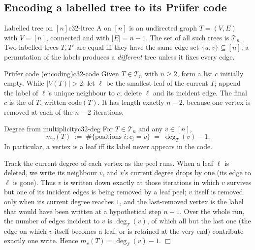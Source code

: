 \subsection{Encoding a labelled tree to its Pr\"ufer code}

\begin{definition}{Labelled tree on \([n]\)}{c32-ltree}
A  on \([n]\) is an undirected graph \(T=(V,E)\) with
\(V=[n]\), connected and with \(|E|=n-1\).  The set of all such trees is
\(\mathcal{T}_n\).  Two labelled trees \(T,T'\) are equal iff they have the
same edge set \(\{u,v\}\subseteq[n]\); a permutation of the labels produces a
\emph{different} tree unless it fixes every edge.
\end{definition}

\begin{definition}{Pr\"ufer code (encoding)}{c32-code}
Given \(T\in\mathcal{T}_n\) with \(n\ge 2\), form a list \(c\) initially
empty.  While \(|V(T)|>2\): let \(\ell\) be the smallest leaf of the current
\(T\); append the label of \(\ell\)'s unique neighbour to \(c\); delete \(\ell\)
and its incident edge.  The final \(c\) is the  of \(T\),
written \(\mathrm{code}(T)\).  It has length exactly \(n-2\), because one
vertex is removed at each of the \(n-2\) iterations.
\end{definition}

\begin{lemma}{Degree from multiplicity}{c32-deg}
For \(T\in\mathcal{T}_n\) and any \(v\in[n]\),
\[
  m_v(T) \;:=\; \#\{\text{positions } i : c_i = v\} \;=\; \deg_T(v) - 1 .
\]
In particular, a vertex is a leaf iff its label never appears in the code.
\end{lemma}

\begin{proofbox}
Track the current degree of each vertex as the peel runs.  When a leaf
\(\ell\) is deleted, we write its neighbour \(v\), and \(v\)'s current degree
drops by one (its edge to \(\ell\) is gone).  Thus \(v\) is written down
exactly at those iterations in which \(v\) survives but one of its incident
edges is being removed by a leaf peel; \(v\) itself is removed only when its
current degree reaches \(1\), and the last-removed vertex is the label that
would have been written at a hypothetical step \(n-1\).  Over the whole
run, the number of edges incident to \(v\) is \(\deg_T(v)\), of which all but
the last one (the edge on which \(v\) itself becomes a leaf, or is retained
at the very end) contribute exactly one write.  Hence \(m_v(T)=\deg_T(v)-1\).
\(\Box\)
\end{proofbox}

